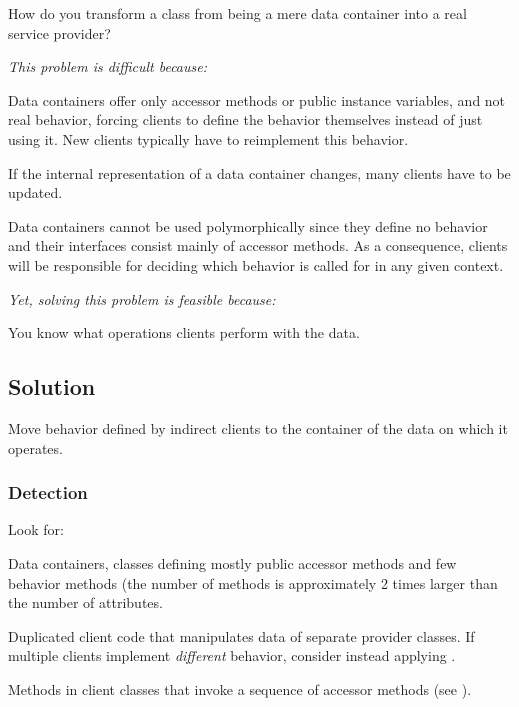 \documentclass[a4paper,10pt,twoside]{book}
\begin{document}
How do you transform a class from being a mere data container into a real service provider?

\emph{This problem is difficult because:}

\begin{bulletlist}
\item Data containers offer only accessor methods or public instance variables, and not real behavior, forcing clients to define the behavior themselves instead of just using it. New clients typically have to reimplement this behavior.

\item If the internal representation of a data container changes, many clients have to be updated.

\item Data containers cannot be used polymorphically since they define no behavior and their interfaces consist mainly of accessor methods. As a consequence, clients will be responsible for deciding which behavior is called for in any given context.
\end{bulletlist}

\emph{Yet, solving this problem is feasible because:} 

\begin{bulletlist}
\item You know what operations clients perform with the data.
\end{bulletlist}

\subsection*{Solution}

Move behavior defined by indirect clients to the container of the data on which it operates.

\subsubsection*{Detection}

Look for:

\begin{bulletlist}
\item Data containers, \ie classes defining mostly public accessor methods and few behavior methods (\ie the number of methods is approximately 2 times larger than the number of attributes.

\item Duplicated client code that manipulates data of separate provider classes. If multiple clients implement \emph{different} behavior, consider instead applying .

\item Methods in client classes that invoke a sequence of accessor methods (see ).
\end{bulletlist}
\end{document}
